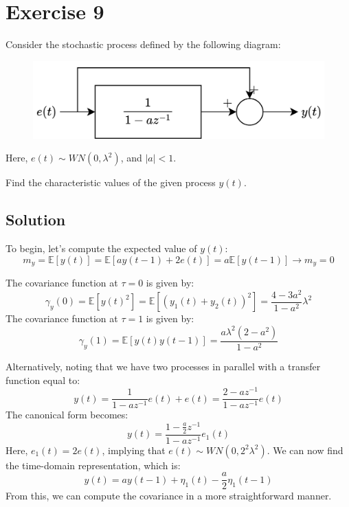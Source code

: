 \section{Exercise 9}

Consider the stochastic process defined by the following diagram:
\begin{figure}[H]
    \centering
    \includegraphics[width=0.5\linewidth]{images/block2.png}
\end{figure}
Here, $e(t) \sim WN(0,\lambda^2)$, and $\left\lvert a\right\rvert <1$.

Find the characteristic values of the given process $y(t)$.

\subsection*{Solution}
To begin, let's compute the expected value of $y(t)$:
\[m_y=\mathbb{E}\left[ y(t) \right]=\mathbb{E}\left[ ay(t-1)+2e(t) \right]=a\mathbb{E}\left[ y(t-1) \right]\rightarrow m_y=0\]

The covariance function at $\tau=0$ is given by:
\[\gamma_y(0)=\mathbb{E}\left[ {y(t)}^2 \right]=\mathbb{E}\left[ {\left(y_1(t)+y_2(t)\right)}^2 \right]=\dfrac{4-3a^2}{1-a^2}\lambda^2\]
The covariance function at $\tau=1$ is given by:
\[\gamma_y(1)=\mathbb{E}\left[ y(t)y(t-1) \right]=\dfrac{a\lambda^2(2-a^2)}{1-a^2}\]

Alternatively, noting that we have two processes in parallel with a transfer function equal to:
\[y(t)=\dfrac{1}{1-az^{-1}}e(t)+e(t)=\dfrac{2-az^{-1}}{1-az^{-1}}e(t)\]
The canonical form becomes:
\[y(t)=\dfrac{1-\frac{a}{2}z^{-1}}{1-az^{-1}}e_1(t)\]
Here, $e_1(t)=2e(t)$, implying that $e(t) \sim WN(0,2^2\lambda^2)$.
We can now find the time-domain representation, which is:
\[y(t)=ay(t-1)+\eta_1(t)-\dfrac{a}{2}\eta_1(t-1)\]
From this, we can compute the covariance in a more straightforward manner.